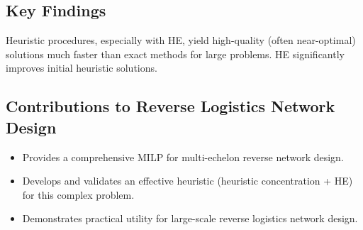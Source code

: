 \subsection*{Key Findings}
Heuristic procedures, especially with HE, yield high-quality (often near-optimal) solutions much faster than exact methods for large problems. HE significantly improves initial heuristic solutions.

\subsection*{Contributions to Reverse Logistics Network Design}
\begin{itemize}
    \item Provides a comprehensive MILP for multi-echelon reverse network design.
    \item Develops and validates an effective heuristic (heuristic concentration + HE) for this complex problem.
    \item Demonstrates practical utility for large-scale reverse logistics network design.
\end{itemize}